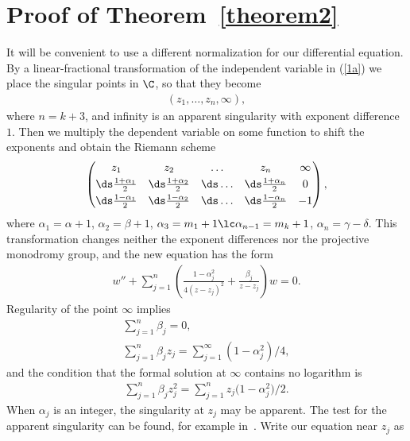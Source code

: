 \section{Proof of Theorem~\ref{theorem2}}\label{section3}

It will be convenient to use a different normalization for our differential equation. By a linear-fractional transformation of the independent variable in (\ref{1a}) we place the singular points in $\C$, so that they become
\begin{gather*}
(z_1,\ldots,z_n,\infty),
\end{gather*}
where $n=k+3$, and infinity is an apparent singularity with exponent difference $1$. Then we multiply the dependent variable on some function to shift the exponents and obtain the Riemann scheme
\begin{gather}\label{rs}
\left(\begin{matrix}z_1&z_2&\ldots&z_n&\infty\vspace{1mm}\\
\ds\frac{1+\alpha_1}{2}&\ds\frac{1+\alpha_2}{2}&\ds\ldots&
\ds\frac{1+\alpha_n}{2}& 0\vspace{1mm}\\
\ds\frac{1-\alpha_1}{2}&\ds\frac{1-\alpha_2}{2}&\ds\ldots&
\ds\frac{1-\alpha_n}{2}&-1\end{matrix}\right),
\end{gather}
where $\alpha_1=\alpha+1$, $\alpha_2=\beta+1$, $\alpha_3=m_1+1\lc \alpha_{n-1}=m_k+1$, $\alpha_n=\gamma-\delta$. This transformation changes neither the exponent differences nor the projective monodromy group, and the new equation has the form
\begin{gather}\label{1b}
w''+\sum_{j=1}^n\left(\frac{1-\alpha_j^2}{4(z-z_j)^2} +\frac{\beta_j}{z-z_j}\right)w=0.
\end{gather}
Regularity of the point $\infty$ implies
\begin{gather}\label{1}
\sum_{j=1}^n\beta_j=0,\\
\label{2}
\sum_{j=1}^n\beta_jz_j=\sum_{j=1}^\infty(1-\alpha_j^2)/4,
\end{gather}
and the condition that the formal solution at $\infty$ contains no logarithm is
\begin{gather}\label{3a}
\sum_{j=1}^n\beta_jz_j^2=\sum_{j=1}^n z_j\big(1-\alpha_j^2\big)/2.
\end{gather}
When $\alpha_j$ is an integer, the singularity at $z_j$ may be apparent. The test for the apparent singularity can be found, for example in~\cite{TL}. Write our equation near $z_j$ as
